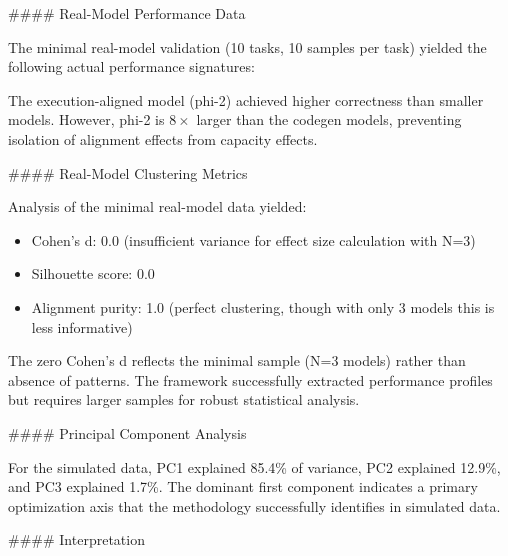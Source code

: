 \#\#\#\# Real-Model Performance Data

The minimal real-model validation (10 tasks, 10 samples per task) yielded the following actual performance signatures:

\begin{table}[htbp]
\centering
{}
\end{table}

The execution-aligned model (phi-2) achieved higher correctness than smaller models. However, phi-2 is $8\times$ larger than the codegen models, preventing isolation of alignment effects from capacity effects.

\#\#\#\# Real-Model Clustering Metrics

Analysis of the minimal real-model data yielded:

\begin{itemize}
\item Cohen's d: 0.0 (insufficient variance for effect size calculation with N=3)
\item Silhouette score: 0.0
\item Alignment purity: 1.0 (perfect clustering, though with only 3 models this is less informative)
\end{itemize}

The zero Cohen's d reflects the minimal sample (N=3 models) rather than absence of patterns. The framework successfully extracted performance profiles but requires larger samples for robust statistical analysis.

\#\#\#\# Principal Component Analysis

For the simulated data, PC1 explained 85.4\% of variance, PC2 explained 12.9\%, and PC3 explained 1.7\%. The dominant first component indicates a primary optimization axis that the methodology successfully identifies in simulated data.

\#\#\#\# Interpretation

